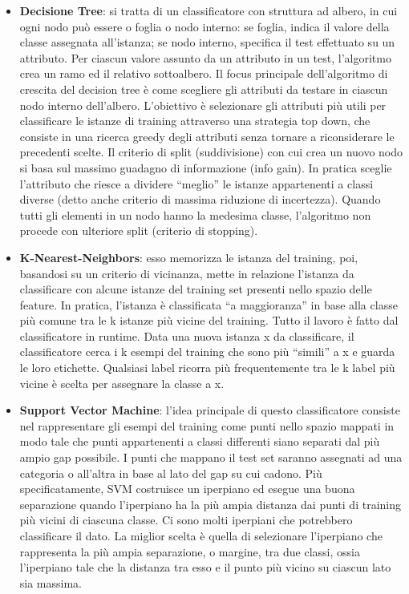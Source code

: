 \begin{itemize}
	\item \textbf{Decisione Tree}: si tratta di un classificatore con struttura ad albero, in cui ogni nodo può essere o foglia o nodo interno: se foglia, indica il valore della classe assegnata all'istanza; se nodo interno, specifica il test effettuato su un attributo. Per ciascun valore assunto da un attributo in un test, l'algoritmo crea un ramo ed il relativo sottoalbero. Il focus principale dell'algoritmo di crescita del decision tree è come scegliere gli attributi da testare in ciascun nodo interno dell'albero. L'obiettivo è selezionare gli attributi più utili per classificare le istanze di training
	attraverso una strategia top down, che consiste in una ricerca greedy degli
	attributi senza tornare a riconsiderare le precedenti scelte. Il criterio di split (suddivisione) con cui crea un nuovo nodo si basa sul massimo guadagno di informazione (info gain). In pratica sceglie l'attributo che riesce a dividere “meglio” le istanze appartenenti a classi diverse (detto anche criterio di massima riduzione di incertezza). Quando tutti gli elementi in un nodo hanno la medesima classe, l'algoritmo non procede con ulteriore split (criterio di stopping).
	\item \textbf{K-Nearest-Neighbors}: esso memorizza le istanza del training, poi, basandosi su un criterio di vicinanza, mette in relazione l'istanza da classificare con alcune istanze del training set presenti nello spazio delle feature.  In pratica, l'istanza è classificata “a maggioranza” in base alla
	classe più comune tra le k istanze più vicine del training. Tutto il lavoro è fatto dal classificatore in runtime. Data una nuova istanza x da classificare, il classificatore cerca i k esempi del training che sono più “simili” a x e
	guarda le loro etichette. Qualsiasi label ricorra più frequentemente tra le k label più vicine è scelta per assegnare la classe a x.
	\item \textbf{Support Vector Machine}:  l'idea principale di questo classificatore consiste nel rappresentare gli esempi del training come punti nello spazio mappati in modo tale che punti appartenenti a classi differenti siano separati dal più ampio gap possibile. I punti che mappano il test set saranno assegnati ad una categoria o all'altra in base al lato del gap su cui cadono. Più specificatamente, SVM costruisce un iperpiano ed esegue una buona separazione quando l'iperpiano ha la più ampia distanza dai punti di training più vicini di ciascuna classe. Ci sono molti iperpiani che potrebbero classificare il dato. La miglior scelta è quella di selezionare l'iperpiano che rappresenta la più ampia separazione, o margine, tra due classi, ossia l'iperpiano tale che la distanza tra esso e il punto più vicino su ciascun lato sia massima.
\end{itemize}
